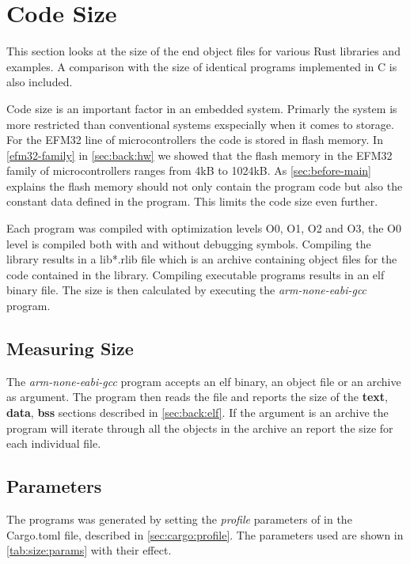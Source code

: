 \section{Code Size}

This section looks at the size of the end object files for various Rust libraries and examples.
A comparison with the size of identical programs implemented in C is also included.

Code size is an important factor in an embedded system.
Primarly the system is more restricted than conventional systems exspecially when it comes to storage.
For the EFM32 line of microcontrollers the code is stored in flash memory.
In \autoref{efm32-family} in \autoref{sec:back:hw} we showed that the flash memory in the EFM32 family of microcontrollers ranges from 4kB to 1024kB.
As \autoref{sec:before-main} explains the flash memory should not only contain the program code but also the constant data defined in the program.
This limits the code size even further.

Each program was compiled with optimization levels O0, O1, O2 and O3, the O0 level is compiled both with and without debugging symbols.
Compiling the library results in a lib*.rlib file which is an archive containing object files for the code contained in the library.
Compiling executable programs results in an elf binary file.
The size is then calculated by executing the \emph{arm-none-eabi-gcc} program.

\subsection{Measuring Size}

The \emph{arm-none-eabi-gcc} program accepts an elf binary, an object file or an archive as argument.
The program then reads the file and reports the size of the \textbf{text}, \textbf{data}, \textbf{bss} sections described in \autoref{sec:back:elf}.
If the argument is an archive the program will iterate through all the objects in the archive an report the size for each individual file.

\subsection{Parameters}
\label{sec:size:params}
The programs was generated by setting the \emph{profile} parameters of in the Cargo.toml file, described in \autoref{sec:cargo:profile}.
The parameters used are shown in \autoref{tab:size:params} with their effect.

